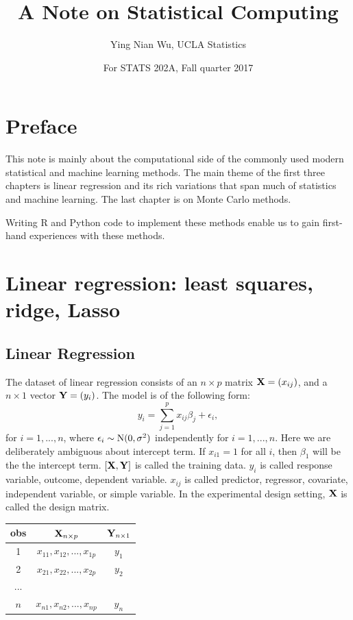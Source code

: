 \documentclass{article}\usepackage[]{graphicx}\usepackage[]{color}
\title{A  Note on Statistical Computing}
\author{Ying Nian Wu, UCLA Statistics}
\date{For STATS 202A, Fall quarter 2017 }
\def\X{{\bf X}}
\def\Y{{\bf Y}}
\begin{document}
 
\maketitle
 
\tableofcontents
 

\section*{Preface}

This note is mainly about the computational side of the commonly used modern statistical and machine learning methods. The main theme of the first three chapters is linear regression and its rich variations that span much of statistics and machine learning. The last chapter is on Monte Carlo methods. 

Writing R and Python code to implement these methods enable us to gain first-hand experiences with these methods. 

\section{Linear regression: least squares, ridge, Lasso} 

\subsection{Linear Regression}

The dataset of linear regression consists of an $n \times p$ matrix $\X = (x_{ij})$, and a $n \times 1$ vector $\Y = (y_i)$.  The model is of the following form: 
\[
    y_i = \sum_{j = 1}^{p} x_{ij} \beta_j + \epsilon_i,
\]
for $i = 1, ..., n$, where $\epsilon_i \sim {\rm N}(0, \sigma^2)$ independently for $i = 1, ..., n$. Here we are deliberately ambiguous about intercept term. If $x_{i1} = 1$ for all $i$, then $\beta_1$ will be the the intercept term. $[\X, \Y]$ is called the training data. $y_i$ is called response variable, outcome, dependent variable. $x_{ij}$ is called predictor, regressor, covariate, independent variable, or simple variable. In the experimental design setting, $\X$ is called the design matrix. 

\begin{table}[h]
\centering
\begin{tabular}{|c|c|c|}
\hline
 obs & $\X_{n\times p}$ & $\Y_{n\times 1}$ \\
\hline\hline
 1   & $x_{11}, x_{12}, ..., x_{1p}$         & $y_1$ \\
 2   & $x_{21}, x_{22}, ..., x_{2p}$         & $y_2$ \\
...  &                 &\\
$n$  &  $x_{n1}, x_{n2}, ..., x_{np}$        & $y_n$ \\
\hline
\end{tabular}
\end{table}
\end{document}
